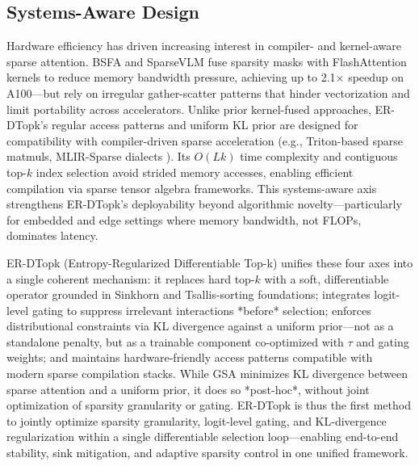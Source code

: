 \documentclass{article}
\begin{document}
\subsection{Systems-Aware Design}
Hardware efficiency has driven increasing interest in compiler- and kernel-aware sparse attention. BSFA \cite{ohayon2025} and SparseVLM \cite{liu2022} fuse sparsity masks with FlashAttention kernels to reduce memory bandwidth pressure, achieving up to 2.1$\times$ speedup on A100---but rely on irregular gather-scatter patterns that hinder vectorization and limit portability across accelerators. Unlike prior kernel-fused approaches, ER-DTopk's regular access patterns and uniform KL prior are designed for compatibility with compiler-driven sparse acceleration (e.g., Triton-based sparse matmuls, MLIR-Sparse dialects \cite{lee2024}). Its $O(Lk)$ time complexity and contiguous top-$k$ index selection avoid strided memory accesses, enabling efficient compilation via sparse tensor algebra frameworks. This systems-aware axis strengthens ER-DTopk's deployability beyond algorithmic novelty---particularly for embedded and edge settings where memory bandwidth, not FLOPs, dominates latency.

ER-DTopk (Entropy-Regularized Differentiable Top-k) unifies these four axes into a single coherent mechanism: it replaces hard top-$k$ with a soft, differentiable operator grounded in Sinkhorn and Tsallis-sorting foundations; integrates logit-level gating to suppress irrelevant interactions *before* selection; enforces distributional constraints via KL divergence against a uniform prior---not as a standalone penalty, but as a trainable component co-optimized with $\tau$ and gating weights; and maintains hardware-friendly access patterns compatible with modern sparse compilation stacks. While GSA \cite{shen2026} minimizes KL divergence between sparse attention and a uniform prior, it does so *post-hoc*, without joint optimization of sparsity granularity or gating. ER-DTopk is thus the first method to jointly optimize sparsity granularity, logit-level gating, and KL-divergence regularization within a single differentiable selection loop---enabling end-to-end stability, sink mitigation, and adaptive sparsity control in one unified framework.
\end{document}

